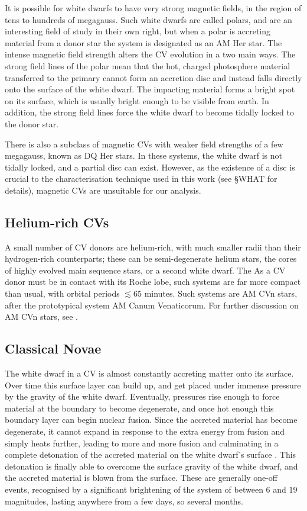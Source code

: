 It is possible for white dwarfs to have very strong magnetic fields, in the region of tens to hundreds of megagauss. Such white dwarfs are called polars, and are an interesting field of study in their own right, but when a polar is accreting material from a donor star the system is designated as an AM Her star. The intense magnetic field strength alters the CV evolution in a two main ways. The strong field lines of the polar mean that the hot, charged photosphere material transferred to the primary cannot form an accretion disc and instead falls directly onto the surface of the white dwarf. The impacting material forms a bright spot on its surface, which is usually bright enough to be visible from earth. In addition, the strong field lines force the white dwarf to become tidally locked to the donor star. 

There is also a subclass of magnetic CVs with weaker field strengths of a few megagauss, known as DQ Her stars. In these systems, the white dwarf is not tidally locked, and a partial disc can exist. However, as the existence of a disc is crucial to the characterisation technique used in this work (see \S WHAT for details), magnetic CVs are unsuitable for our analysis.

\subsection{Helium-rich CVs}
\label{sect:introduction:AM CVn}

A small number of CV donors are helium-rich, with much smaller radii than their hydrogen-rich counterparts; these can be semi-degenerate helium stars, the cores of highly evolved main sequence stars, or a second white dwarf. The  As a CV donor must be in contact with its Roche lobe, such systems are far more compact than usual, with orbital periods $\lesssim 65$ minutes. Such systems are AM CVn stars, after the prototypical system AM Canum Venaticorum. For further discussion on AM CVn stars, see \citep{solheim2010}.


\subsection{Classical Novae}
\label{sect:introduction:classical novae}

The white dwarf in a CV is almost constantly accreting matter onto its surface. Over time this surface layer can build up, and get placed under immense pressure by the gravity of the white dwarf. Eventually, pressures rise enough to force material at the boundary to become degenerate, and once hot enough this boundary layer can begin nuclear fusion. 
Since the accreted material has become degenerate, it cannot expand in response to the extra energy from fusion and simply heats further, leading to more and more fusion and culminating in a complete detonation of the accreted material on the white dwarf's surface \citep{warner1995}. This detonation is finally able to overcome the surface gravity of the white dwarf, and the accreted material is blown from the surface.
These are generally one-off events, recognised by a significant brightening of the system of between 6 and 19 magnitudes, lasting anywhere from a few days, so several months. 

